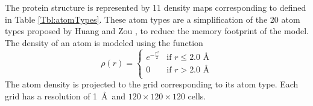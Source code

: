 The protein structure is represented by 11 density maps corresponding
to  defined in Table \ref{Tbl:atomTypes}.
%
These atom types are a simplification of the 20 atom types proposed by
Huang and Zou \cite{huang2006iterative, huang2008iterative}, to reduce
the memory footprint of the model.
%
%
The density of an atom is modeled using the function
\begin{equation}
\label{eq:rho}
\rho(r) =  \begin{cases}
               e^{-\frac{r^2}{2}}&\text{if } r\leq 2.0\text{ \AA} \\
               0                 &\text{if } r>2.0\text{ \AA} \\
            \end{cases}
\end{equation}
The atom density is projected to the grid corresponding to its atom
type. Each grid has a resolution of 1~\AA\ and 
$120\times 120\times 120$ cells.

